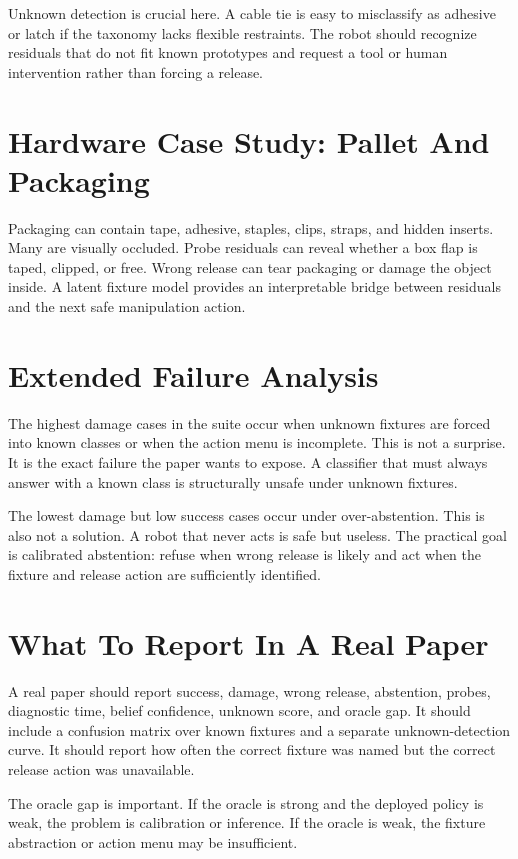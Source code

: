 \documentclass{article}
\begin{document}
Unknown detection is crucial here. A cable tie is easy to misclassify as
adhesive or latch if the taxonomy lacks flexible restraints. The robot should
recognize residuals that do not fit known prototypes and request a tool or
human intervention rather than forcing a release.

\section{Hardware Case Study: Pallet And Packaging}

Packaging can contain tape, adhesive, staples, clips, straps, and hidden
inserts. Many are visually occluded. Probe residuals can reveal whether a box
flap is taped, clipped, or free. Wrong release can tear packaging or damage
the object inside. A latent fixture model provides an interpretable bridge
between residuals and the next safe manipulation action.

\section{Extended Failure Analysis}

The highest damage cases in the suite occur when unknown fixtures are forced
into known classes or when the action menu is incomplete. This is not a
surprise. It is the exact failure the paper wants to expose. A classifier that
must always answer with a known class is structurally unsafe under unknown
fixtures.

The lowest damage but low success cases occur under over-abstention. This is
also not a solution. A robot that never acts is safe but useless. The practical
goal is calibrated abstention: refuse when wrong release is likely and act
when the fixture and release action are sufficiently identified.

\section{What To Report In A Real Paper}

A real paper should report success, damage, wrong release, abstention, probes,
diagnostic time, belief confidence, unknown score, and oracle gap. It should
include a confusion matrix over known fixtures and a separate unknown-detection
curve. It should report how often the correct fixture was named but the correct
release action was unavailable.

The oracle gap is important. If the oracle is strong and the deployed policy is
weak, the problem is calibration or inference. If the oracle is weak, the
fixture abstraction or action menu may be insufficient.
\end{document}

